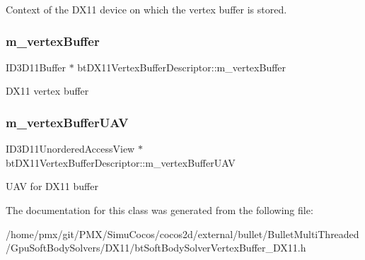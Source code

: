 Context of the D\+X11 device on which the vertex buffer is stored. \mbox{\label{classbtDX11VertexBufferDescriptor_adbb051cf68333a8409967bc638e4b322}} 
\subsubsection{\texorpdfstring{m\+\_\+vertex\+Buffer}{m\_vertexBuffer}}
{\footnotesize\ttfamily I\+D3\+D11\+Buffer $\ast$ bt\+D\+X11\+Vertex\+Buffer\+Descriptor\+::m\+\_\+vertex\+Buffer\hspace{0.3cm}{\ttfamily [protected]}}

D\+X11 vertex buffer \mbox{\label{classbtDX11VertexBufferDescriptor_a2f800339315be90e94c872625f5a68c1}} 
\subsubsection{\texorpdfstring{m\+\_\+vertex\+Buffer\+U\+AV}{m\_vertexBufferUAV}}
{\footnotesize\ttfamily I\+D3\+D11\+Unordered\+Access\+View $\ast$ bt\+D\+X11\+Vertex\+Buffer\+Descriptor\+::m\+\_\+vertex\+Buffer\+U\+AV\hspace{0.3cm}{\ttfamily [protected]}}

U\+AV for D\+X11 buffer 

The documentation for this class was generated from the following file\+:\begin{DoxyCompactItemize}
\item 
/home/pmx/git/\+P\+M\+X/\+Simu\+Cocos/cocos2d/external/bullet/\+Bullet\+Multi\+Threaded/\+Gpu\+Soft\+Body\+Solvers/\+D\+X11/bt\+Soft\+Body\+Solver\+Vertex\+Buffer\+\_\+\+D\+X11.\+h\end{DoxyCompactItemize}
